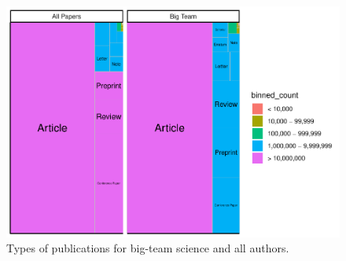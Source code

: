 \documentclass[
  man,mask,floatsintext]{apa7}
\begin{document}
\begin{figure}
\centering
\includegraphics{manuscript_scopus_files/figure-latex/fig-pub-types-1.pdf}
\caption{\label{fig:fig-pub-types}Types of publications for big-team science and all authors.}
\end{figure}
\end{document}
